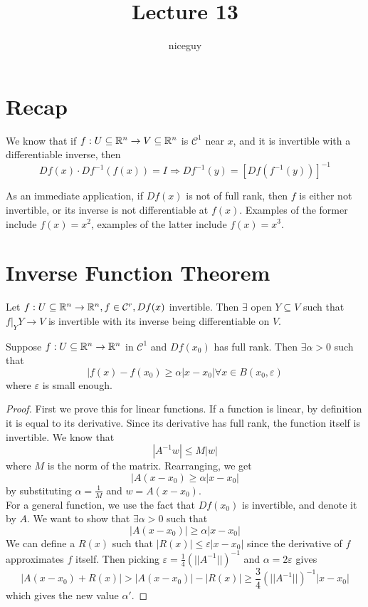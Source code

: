 \documentclass[12pt]{article}
\title{Lecture 13}
\author{niceguy}
\begin{document}
\maketitle

\section{Recap}

We know that if $f: U \subseteq \mathbb{R}^n \rightarrow V \subseteq \mathbb{R}^n$ is $\mathcal C^1$ near $x$, and it is invertible with a differentiable inverse, then
$$Df(x) \cdot Df^{-1}(f(x)) = I \Rightarrow Df^{-1}(y) = \left[Df\left(f^{-1}(y)\right)\right]^{-1}$$

As an immediate application, if $Df(x)$ is not of full rank, then $f$ is either not invertible, or its inverse is not differentiable at $f(x)$. Examples of the former include $f(x) = x^2$, examples of the latter include $f(x) = x^3$.

\section{Inverse Function Theorem}

\begin{thm}
    Let $f: U \subseteq \mathbb{R}^n \rightarrow \mathbb{R}^n, f \in \mathcal C^r, Df(x)$ invertible. Then $\exists$ open $Y \subseteq V$ such that $f|_Y Y \rightarrow V$ is invertible with its inverse being differentiable on $V$.
\end{thm}

\begin{lem}
    Suppose $f: U \subseteq \mathbb{R}^n \rightarrow \mathbb{R}^n$ in $\mathcal C^1$ and $Df(x_0)$ has full rank. Then $\exists \alpha > 0$ such that
    $$|f(x) - f(x_0) \geq \alpha |x-x_0| \forall x \in B(x_0,\varepsilon)$$
    where $\varepsilon$ is small enough.
\end{lem}

\begin{proof}
    First we prove this for linear functions. If a function is linear, by definition it is equal to its derivative. Since its derivative has full rank, the function itself is invertible. We know that
    $$|A^{-1}w| \leq M|w|$$
    where $M$ is the norm of the matrix. Rearranging, we get
    $$|A(x-x_0) \geq \alpha |x-x_0|$$
    by substituting $\alpha = \frac{1}{M}$ and $w = A(x-x_0)$. \\
    For a general function, we use the fact that $Df(x_0)$ is invertible, and denote it by $A$. We want to show that $\exists \alpha > 0$ such that
    $$|A(x-x_0)| \geq \alpha |x-x_0|$$
    We can define a $R(x)$ such that $|R(x)| \leq \varepsilon |x-x_0|$ since the derivative of $f$ approximates $f$ itself. Then picking $\varepsilon = \frac{1}{4} \left(||A^{-1}||\right)^{-1}$ and $\alpha = 2\varepsilon$ gives
    $$|A(x-x_0) + R(x)| > |A(x-x_0)| - |R(x)| \geq \frac{3}{4} \left(||A^{-1}||\right)^{-1}|x-x_0|$$
    which gives the new value $\alpha'$.
\end{proof}
\end{document}
